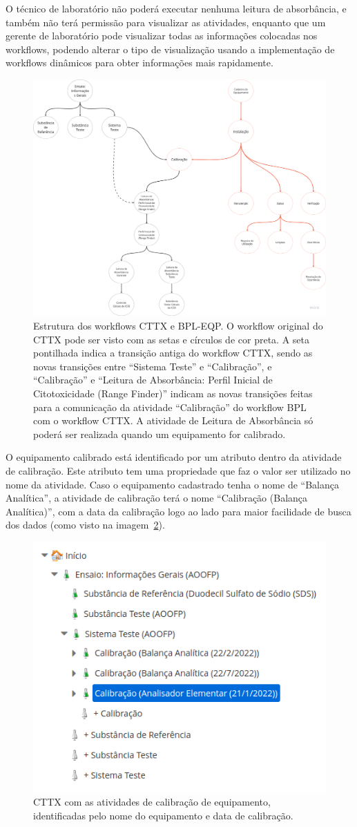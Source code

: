 O técnico de laboratório não poderá executar nenhuma leitura de absorbância, e também não terá permissão para visualizar as atividades, enquanto que um gerente de laboratório pode visualizar todas as informações colocadas nos workflows, podendo alterar o tipo de visualização usando a implementação de workflows dinâmicos para obter informações mais rapidamente.

\begin{figure}
    \centering
    \includegraphics[width=1\textwidth]{imgs/CTTX-EQP/estrutura_cttx_eqp.png}
    \caption{Estrutura dos workflows CTTX e BPL-EQP. O workflow original do CTTX pode ser visto com as setas e círculos de cor preta. A seta pontilhada indica a transição antiga do workflow CTTX, sendo as novas transições entre ``Sistema Teste'' e ``Calibração'', e ``Calibração'' e ``Leitura de Absorbância: Perfil Inicial de Citotoxicidade (Range Finder)'' indicam as novas transições feitas para a comunicação da atividade ``Calibração'' do workflow BPL com o workflow CTTX. A atividade de Leitura de Absorbância só poderá ser realizada quando um equipamento for calibrado.}
    \label{fig:cttx_eqp_structure}
\end{figure}

O equipamento calibrado está identificado por um atributo dentro da atividade de calibração. Este atributo tem uma propriedade que faz o valor ser utilizado no nome da atividade. Caso o equipamento cadastrado tenha o nome de ``Balança Analítica'', a atividade de calibração terá o nome ``Calibração (Balança Analítica)'', com a data da calibração logo ao lado para maior facilidade de busca dos dados (como visto na imagem~\ref{fig:cttx_eqp_calibration}).

\begin{figure}
    \centering
    \includegraphics[width=.5\textwidth]{imgs/CTTX-EQP/calibration_tree.png}
    \caption{CTTX com as atividades de calibração de equipamento, identificadas pelo nome do equipamento e data de calibração.}
    \label{fig:cttx_eqp_calibration}
\end{figure}